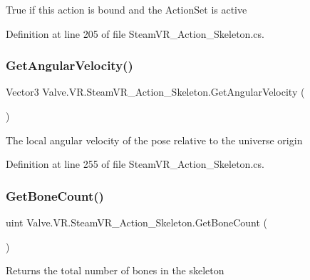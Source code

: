 True if this action is bound and the Action\+Set is active 



Definition at line 205 of file Steam\+V\+R\+\_\+\+Action\+\_\+\+Skeleton.\+cs.

\mbox{\label{class_valve_1_1_v_r_1_1_steam_v_r___action___skeleton_af165c26390ceb37afdaf3db442d0d1b3}} 
\subsubsection{\texorpdfstring{GetAngularVelocity()}{GetAngularVelocity()}}
{\footnotesize\ttfamily Vector3 Valve.\+V\+R.\+Steam\+V\+R\+\_\+\+Action\+\_\+\+Skeleton.\+Get\+Angular\+Velocity (\begin{DoxyParamCaption}{ }\end{DoxyParamCaption})}



The local angular velocity of the pose relative to the universe origin 



Definition at line 255 of file Steam\+V\+R\+\_\+\+Action\+\_\+\+Skeleton.\+cs.

\mbox{\label{class_valve_1_1_v_r_1_1_steam_v_r___action___skeleton_aec0391bff41788a0f69886ac6299e310}} 
\subsubsection{\texorpdfstring{GetBoneCount()}{GetBoneCount()}}
{\footnotesize\ttfamily uint Valve.\+V\+R.\+Steam\+V\+R\+\_\+\+Action\+\_\+\+Skeleton.\+Get\+Bone\+Count (\begin{DoxyParamCaption}{ }\end{DoxyParamCaption})}



Returns the total number of bones in the skeleton 



